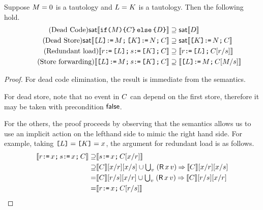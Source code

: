\begin{lemma}
  Suppose $M=0$ is a tautology and $L=K$ is a tautology.   Then the following hold.
  \begin{align*}
  \tag{Dead Code} 
  \mathsf{sat}\llbracket\texttt{if}\allowbreak\texttt{(}M\texttt{)}\allowbreak\texttt{\{}C\texttt{\}}\,\allowbreak\texttt{else}\allowbreak\,\texttt{\{}D\texttt{\}}\rrbracket &\supseteq 
  \mathsf{sat}\llbracket D\rrbracket \\
  \tag{Dead Store} 
  \mathsf{sat}\llbracket\texttt{[}L\texttt{]} \texttt{:}\mkern-1mu\texttt{=}\, M \texttt{;}\, \texttt{[}K\texttt{]} \texttt{:}\mkern-1mu\texttt{=}\, N \texttt{;}\, C\rrbracket &\supseteq 
  \mathsf{sat}\llbracket\texttt{[}K\texttt{]} \texttt{:}\mkern-1mu\texttt{=}\, N \texttt{;}\, C\rrbracket\\    
  \tag{Redundant load}
  \llbracket r \texttt{:}\mkern-1mu\texttt{=}\, \texttt{[}L\texttt{]} \texttt{;}\, s \texttt{:}\mkern-1mu\texttt{=}\, \texttt{[}K\texttt{]}  \texttt{;}\, C\rrbracket &\supseteq
  \llbracket r \texttt{:}\mkern-1mu\texttt{=}\, \texttt{[}L\texttt{]} \texttt{;}\, C[r/s]\rrbracket \\
  \tag{Store forwarding} 
  \llbracket\texttt{[}L\texttt{]} \texttt{:}\mkern-1mu\texttt{=}\, M \texttt{;}\, s \texttt{:}\mkern-1mu\texttt{=}\, \texttt{[}K\texttt{]} \texttt{;}\, C\rrbracket &\supseteq 
  \llbracket\texttt{[}L\texttt{]} \texttt{:}\mkern-1mu\texttt{=}\, M \texttt{;}\, C[M/s]\rrbracket
\end{align*}
\begin{proof}
  For dead code elimination, the result is immediate from the semantics.
  
  For dead store, note that no event in $C$ can depend on the first store,
  therefore it may be taken with precondition $\mathsf{false}$.
  
  For the others, the proof proceeds by observing that the semantics allows us
  to use an implicit action on the lefthand side to mimic the right hand side.
  For example, taking $\texttt{[}L\texttt{]}=\texttt{[}K\texttt{]}=x$, the argument for
  redundant load is as follows.
  \begin{align*}
    \sem{\aReg \GETS \aLoc \SEMI \bReg \GETS \aLoc  \SEMI \aCmd} 
    \supseteq&  \sem{ \bReg  \GETS \aLoc \SEMI \aCmd[\aLoc/\aReg]} \\
    \supseteq&  \sem{\aCmd}[\aLoc/\aReg][\aLoc/\bReg] \cup  \textstyle\bigcup_\aVal\;  (\DR\aLoc\aVal) \prefix \sem{\aCmd}[\aLoc/\aReg][\aLoc/\bReg]\\
    =& \sem{\aCmd}[\aReg/ \bReg][\aLoc/\aReg] \cup  \textstyle\bigcup_\aVal\;  (\DR\aLoc\aVal) \prefix \sem{\aCmd}[\aReg/ \bReg][\aLoc/\aReg]\\
    =& \sem{\aReg \GETS \aLoc\SEMI \aCmd[\aReg/\bReg]}
    \tag*{\qedhere}
  \end{align*}
\end{proof}
\end{lemma}
  
